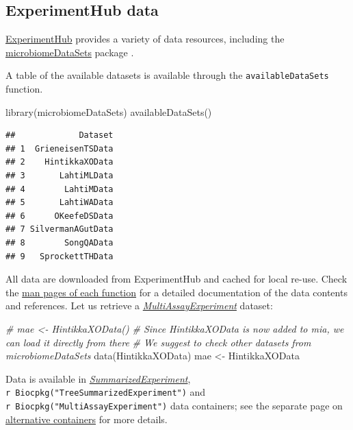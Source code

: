 \documentclass[
]{book}
\newenvironment{Shaded}{\begin{snugshade}}{\end{snugshade}}
\newcommand{\CommentTok}[1]{\textcolor[rgb]{0.56,0.35,0.01}{\textit{#1}}}
\newcommand{\FunctionTok}[1]{\textcolor[rgb]{0.00,0.00,0.00}{#1}}
\newcommand{\NormalTok}[1]{#1}
\newcommand{\OtherTok}[1]{\textcolor[rgb]{0.56,0.35,0.01}{#1}}
\begin{document}
\hypertarget{experimenthub-data}{%
\subsection{ExperimentHub data}\label{experimenthub-data}}

\href{https://bioconductor.org/packages/release/bioc/vignettes/ExperimentHub/inst/doc/ExperimentHub.html}{ExperimentHub}
provides a variety of data resources, including the
\href{https://bioconductor.org/packages/release/data/experiment/html/microbiomeDataSets.html}{microbiomeDataSets}
package \citep{Morgan2021, microlahti2021}.

A table of the available datasets is available through the
\texttt{availableDataSets} function.

\begin{Shaded}
\begin{Highlighting}[]
\FunctionTok{library}\NormalTok{(microbiomeDataSets)}
\FunctionTok{availableDataSets}\NormalTok{()}
\end{Highlighting}
\end{Shaded}

\begin{verbatim}
##             Dataset
## 1  GrieneisenTSData
## 2    HintikkaXOData
## 3       LahtiMLData
## 4        LahtiMData
## 5       LahtiWAData
## 6      OKeefeDSData
## 7 SilvermanAGutData
## 8        SongQAData
## 9   SprockettTHData
\end{verbatim}

All data are downloaded from ExperimentHub and cached for local
re-use. Check the \href{https://microbiome.github.io/microbiomeDataSets/reference/index.html}{man pages of each
function}
for a detailed documentation of the data contents and references. Let
us retrieve a \emph{\href{https://bioconductor.org/packages/3.17/MultiAssayExperiment}{MultiAssayExperiment}} dataset:

\begin{Shaded}
\begin{Highlighting}[]
\CommentTok{\# mae \textless{}{-} HintikkaXOData()}
\CommentTok{\# Since HintikkaXOData is now added to mia, we can load it directly from there}
\CommentTok{\# We suggest to check other datasets from microbiomeDataSets}
\FunctionTok{data}\NormalTok{(HintikkaXOData)}
\NormalTok{mae }\OtherTok{\textless{}{-}}\NormalTok{ HintikkaXOData}
\end{Highlighting}
\end{Shaded}

Data is available in \emph{\href{https://bioconductor.org/packages/3.17/SummarizedExperiment}{SummarizedExperiment}}, \texttt{r\ Biocpkg("TreeSummarizedExperiment")} and \texttt{r\ Biocpkg("MultiAssayExperiment")} data containers; see the separate
page on \href{https://microbiome.github.io/OMA/multitable.html}{alternative
containers} for more
details.
\end{document}
